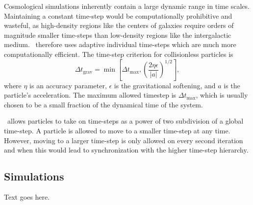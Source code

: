 Cosmological simulations inherently contain a large dynamic range in time scales.  Maintaining a constant time-step would be computationally prohibitive and wasteful, as high-density regions like the centers of galaxies require orders of magnitude smaller time-steps than low-density regions like the intergalactic medium.  \gadgettwo\ therefore uses adaptive individual time-steps which are much more computationally efficient.  The time-step criterion for collisionless particles is
\begin{equation}
	\Delta t_{\mathrm{grav}} = \min \left[ \Delta t_{\max}, \left( \frac{2 \eta \epsilon}{|a|} \right)^{1/2} \right],
\end{equation}
where $\eta$ is an accuracy parameter, $\epsilon$ is the gravitational softening, and $a$ is the particle's acceleration.  The maximum allowed timestep is $\Delta t_{\max}$, which is usually chosen to be a small fraction of the dynamical time of the system.

\gadgettwo\ allows particles to take on time-steps as a power of two subdivision of a global time-step.  A particle is allowed to move to a smaller time-step at any time.  However, moving to a larger time-step is only allowed on every second iteration and when this would lead to synchronization with the higher time-step hierarchy.




\subsection{Simulations}
\label{subsec:gadget--simulations}


Text goes here.




